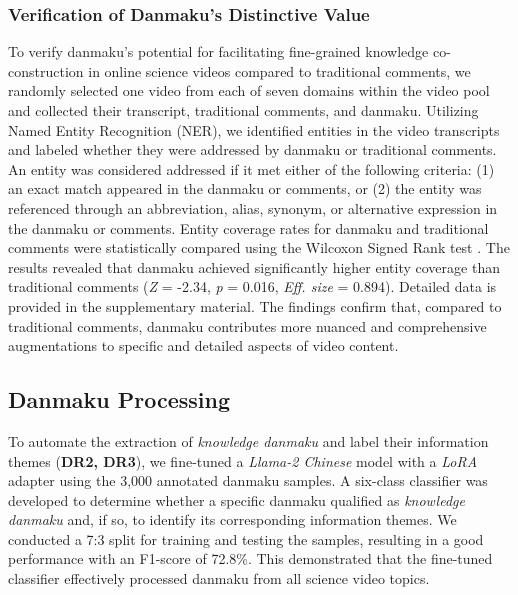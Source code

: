 \subsubsection{Verification of Danmaku's Distinctive Value}
To verify danmaku's potential for facilitating fine-grained knowledge co-construction in online science videos compared to traditional comments, we randomly selected one video from each of seven domains within the video pool and collected their transcript, traditional comments, and danmaku. Utilizing Named Entity Recognition (NER), we identified entities in the video transcripts and labeled whether they were addressed by danmaku or traditional comments. An entity was considered addressed if it met either of the following criteria: (1) an exact match appeared in the danmaku or comments, or (2) the entity was referenced through an abbreviation, alias, synonym, or alternative expression in the danmaku or comments.
Entity coverage rates for danmaku and traditional comments were statistically compared using the Wilcoxon Signed Rank test \cite{woolson2005wilcoxon}. The results revealed that danmaku achieved significantly higher entity coverage than traditional comments (\textit{Z} = -2.34, \textit{p} = 0.016, \textit{Eff. size} = 0.894). Detailed data is provided in the supplementary material. The findings confirm that, compared to traditional comments, danmaku contributes more nuanced and comprehensive augmentations to specific and detailed aspects of video content.


\subsection{Danmaku Processing}

To automate the extraction of \textit{knowledge danmaku} and label their information themes (\textbf{DR2, DR3}), we fine-tuned a \textit{Llama-2 Chinese} model \cite{cui2023efficient} with a \textit{LoRA} adapter \cite{hu2021lora} using the 3,000 annotated danmaku samples. A six-class classifier was developed to determine whether a specific danmaku qualified as \textit{knowledge danmaku} and, if so, to identify its corresponding information themes. We conducted a 7:3 split for training and testing the samples, resulting in a good performance with an F1-score of 72.8\%. This demonstrated that the fine-tuned classifier effectively processed danmaku from all science video topics.
 
